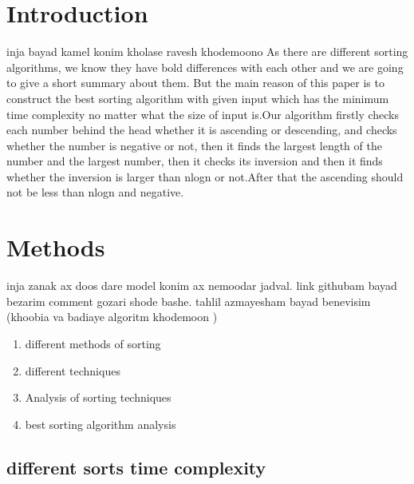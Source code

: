 \documentclass[
10pt, %
a4paper, %
oneside, %
headinclude,footinclude, %
BCOR5mm, %
]{scrartcl}
\begin{document}
\section{Introduction}
inja bayad kamel konim kholase ravesh khodemoono
As there are different sorting algorithms, we know they have  
bold differences with each other and we are going to give a short summary about them. But the main reason of this paper is to construct the best sorting algorithm with given input which has the minimum time complexity no matter what the size of input is.Our algorithm firstly checks each number behind the head whether it is ascending or descending, and checks whether the number is negative or not, then it finds the largest length of the number and the largest number, then it checks its inversion and then it finds whether the inversion is larger than nlogn or not.After that the ascending should not be less than nlogn and negative.

\section{Methods}

inja zanak ax doos dare model konim ax nemoodar jadval. link githubam bayad bezarim comment gozari shode bashe.
tahlil azmayesham bayad benevisim (khoobia va badiaye algoritm khodemoon )
\begin{enumerate}[noitemsep]
\item different methods of sorting
\item different techniques
\item Analysis of sorting techniques 
\item best sorting algorithm analysis
\end{enumerate}


\subsection{different sorts time complexity}
\end{document}

